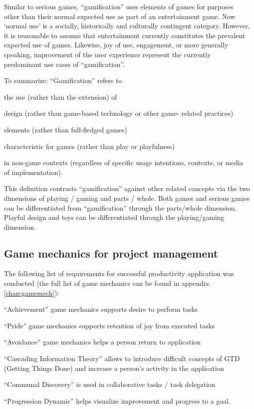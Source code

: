 Similar to serious games, ``gamification'' uses elements of games for purposes other than their normal expected use as part of an entertainment game. Now `normal use' is a socially, historically and culturally contingent category. However, it is reasonable to assume that entertainment currently constitutes the prevalent expected use of games. Likewise, joy of use, engagement, or more generally speaking, improvement of the user experience represent the currently predominant use cases of ``gamification''.

To summarize: ``Gamification'' refers to
\begin{compactitem}
\item the use (rather than the extension) of
\item design (rather than game-based technology or other game-
related practices)
\item elements (rather than full-fledged games)
\item characteristic for games (rather than play or playfulness)
\item in non-game contexts (regardless of specific usage intentions, contexts, or media of implementation).
\end{compactitem}


This definition contrasts ``gamification'' against other related concepts via the two dimensions of playing / gaming and parts / whole. Both games and serious games can be differentiated from ``gamification'' through the parts/whole dimension. Playful design and toys can be differentiated through the playing/gaming dimension.


\subsection{Game mechanics for project management}

The following list of requirements for successful productivity application was conducted (the full list of game mechanics can be found in appendix \ref{chap:gamemech}):

\begin{compactitem}
\item ``Achievement'' game mechanics supports desire to perform tasks
\item ``Pride'' game mechanics supports retention of joy from executed tasks
\item ``Avoidance'' game mechanics helps a person return to application
\item ``Cascading Information Theory'' allows to introduce difficult concepts of GTD (Getting Things Done) and increase a person’s activity in the application
\item ``Communal Discovery'' is used in collaborative tasks / task delegation
\item ``Progression Dynamic'' helps visualize improvement and progress to a goal.
\end{compactitem}

